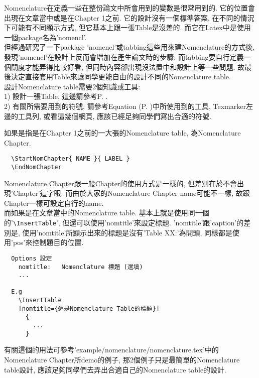 
Nomenclature在定義一些在整份論文中所會用到的變數是很常用到的. 它的位置會出現在文章當中或是在Chapter 1之前. 它的設計沒有一個標準答案, 在不同的情況下可能有不同顯示方式, 但它基本上跟一張Table是沒差的. 而它在Latex中是使用一個package名為'nomencl'.\\

但經過研究了一下package 'nomencl'或tabbing這些用來建Nomenclature的方式後, 發現'nomencl'在設計上反而會增加在產生論文時的步驟; 而tabbing要自行定義一個闊度才能弄得比較好看, 但同時內容卻出現沒法置中和設計上等一些問題. 故最後決定直接套用Table來讓同學更能自由的設計不同的Nomenclature table.\\

設計Nomenclature table需要2個知識或工具:\\
1) 設計一張Table, 這邊請參考P. .\\
2) 有關所需要用到的符號, 請參考Equation (P. )中所使用到的工具, Texmarker左邊的工具列, 或看這幾個網頁, 應該已經足夠同學們寫出合適的符號.

{}

如果是指是在Chapter 1之前的一大張的Nomenclature table, 為Nomenclature Chapter. 
  \begin{verbatim}
  \StartNomChapter{ NAME }{ LABEL }
  \EndNomChapter
  \end{verbatim}
Nomenclature Chapter跟一般Chapter的使用方式是一樣的, 但差別在於不會出現'Chapter'這字眼. 而由於大家的Nomenclature Chapter name可能不一樣, 故跟Chapter一樣可設定自行的name.\\

而如果是在文章當中的Nomenclature table. 基本上就是使用同一個的'\verb|\InsertTable|', 但還可以使用'nomtitle'來設定標題. 'nomtitle'跟'caption'的差別是, 使用'nomtitle'所顯示出來的標題是沒有'Table XX:'為開頭, 同樣都是使用'pos'來控制題目的位置.

  \EmptyLine
  \begin{fmpage}{\textwidth}
  \begin{verbatim}
  Options 設定
    nomtitle:   Nomenclature 標題 (選填)
    ...

  E.g
    \InsertTable
    [nomtitle={這是Nomenclature Table的標題}]
      {
        ...
      }
  \end{verbatim}
  \end{fmpage}
  \EmptyLine

有關這個的用法可參考'example/nomenclature/nomenclature.tex'中的Nomenclature Chapter所demo的例子, 那2個例子只是最簡單的Nomenclature table設計, 應該足夠同學們去弄出合適自己的Nomenclature table的設計.

